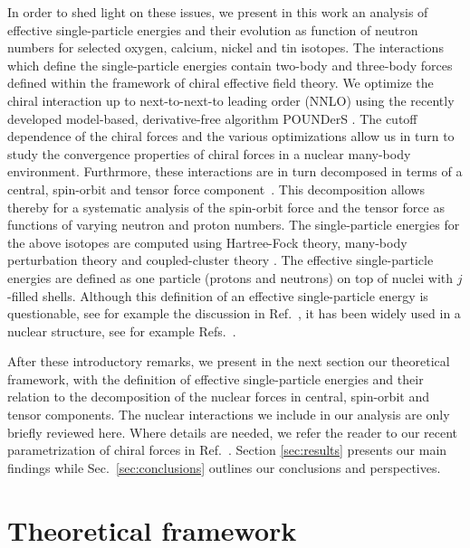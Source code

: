 \documentclass[preprint,12pt,authoryear]{elsarticle}
\begin{document}
In order to shed light on these issues, we present in this work an
analysis of effective single-particle energies and their evolution as
function of neutron numbers for selected oxygen, calcium, nickel and
tin isotopes. The interactions which define the single-particle
energies contain two-body and three-body forces defined within the
framework of chiral effective field theory.  We optimize the chiral
interaction up to next-to-next-to leading order (NNLO) using the
recently developed model-based, derivative-free algorithm POUNDerS
\cite{taoman}.  The cutoff dependence of the chiral forces and the
various optimizations allow us in turn to study the convergence
properties of chiral forces in a nuclear many-body
environment. Furthrmore, these interactions are in turn decomposed in
terms of a central, spin-orbit and tensor force
component~\cite{elliott1968,kirson1973,brown1988,osnes1992,richter1991,smirnova2010}. This
decomposition allows thereby for a systematic analysis of the
spin-orbit force and the tensor force as functions of varying neutron
and proton numbers.  The single-particle energies for the above
isotopes are computed using Hartree-Fock theory, many-body
perturbation theory and coupled-cluster theory
\cite{shavittbartlett2009}. The effective single-particle energies are defined
as one particle (protons and neutrons) on top of nuclei with
$j$-filled shells. Although this definition of an effective single-particle
energy is questionable, see for example the discussion in
Ref.~\cite{duguet2012}, it has been widely used in a 
nuclear structure, see for example
Refs.~\cite{otsuka2005,otsuka2010b,smirnova2010,nowacki2012,smirnova2012,sorlin2008}.

After these introductory remarks, we present in the next section our
theoretical framework, with the definition of effective
single-particle energies and their relation to the decomposition of
the nuclear forces in central, spin-orbit and tensor components. The
nuclear interactions we include in our analysis are only briefly
reviewed here. Where details are needed, we refer the reader to our
recent parametrization of chiral forces in
Ref.~\cite{carlsson2014}. Section \ref{sec:results} presents our main
findings while Sec.~\ref{sec:conclusions} outlines our conclusions
and perspectives.






 
\section{Theoretical framework}\label{sec:formalism}
\end{document}
